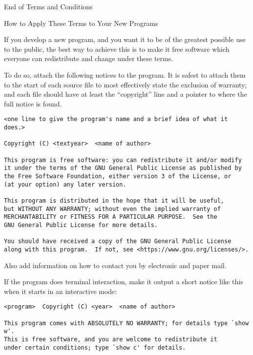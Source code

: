 \documentclass[11pt]{article}
\begin{document}
\begin{enumerate}
\begin{center}
{\Large\sc End of Terms and Conditions}

\bigskip
How to Apply These Terms to Your New Programs
\end{center}

If you develop a new program, and you want it to be of the greatest
possible use to the public, the best way to achieve this is to make it
free software which everyone can redistribute and change under these terms.

To do so, attach the following notices to the program.  It is safest
to attach them to the start of each source file to most effectively
state the exclusion of warranty; and each file should have at least
the ``copyright'' line and a pointer to where the full notice is found.

{\footnotesize
\begin{verbatim}
<one line to give the program's name and a brief idea of what it does.>

Copyright (C) <textyear>  <name of author>

This program is free software: you can redistribute it and/or modify
it under the terms of the GNU General Public License as published by
the Free Software Foundation, either version 3 of the License, or
(at your option) any later version.

This program is distributed in the hope that it will be useful,
but WITHOUT ANY WARRANTY; without even the implied warranty of
MERCHANTABILITY or FITNESS FOR A PARTICULAR PURPOSE.  See the
GNU General Public License for more details.

You should have received a copy of the GNU General Public License
along with this program.  If not, see <https://www.gnu.org/licenses/>.
\end{verbatim}
}

Also add information on how to contact you by electronic and paper mail.

If the program does terminal interaction, make it output a short
notice like this when it starts in an interactive mode:

{\footnotesize
\begin{verbatim}
<program>  Copyright (C) <year>  <name of author>

This program comes with ABSOLUTELY NO WARRANTY; for details type `show w'.
This is free software, and you are welcome to redistribute it
under certain conditions; type `show c' for details.
\end{verbatim}
}


\end{enumerate}
\end{document}
